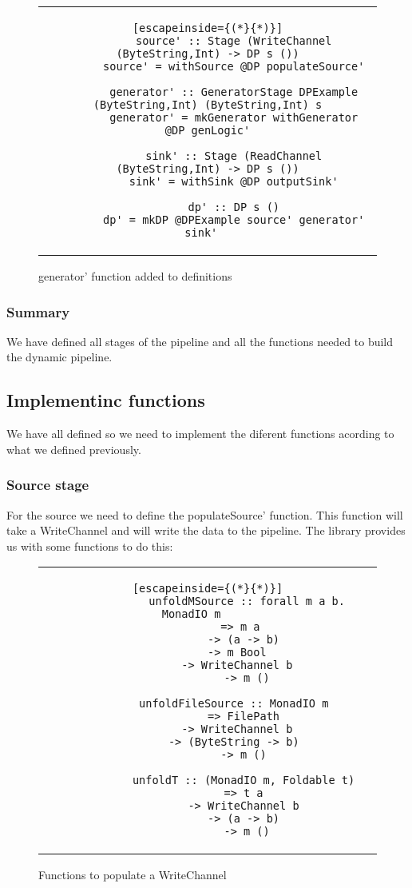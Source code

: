 \begin{figure}[H]
    \centering
    \begin{tabular}{c}
        \begin{lstlisting}[escapeinside={(*}{*)}]
        source' :: Stage (WriteChannel (ByteString,Int) -> DP s ())
        source' = withSource @DP populateSource'

        generator' :: GeneratorStage DPExample (ByteString,Int) (ByteString,Int) s
        generator' = mkGenerator withGenerator @DP genLogic'

        sink' :: Stage (ReadChannel (ByteString,Int) -> DP s ())
        sink' = withSink @DP outputSink'

        dp' :: DP s ()
        dp' = mkDP @DPExample source' generator' sink'  
        \end{lstlisting}
    \end{tabular}
    \caption{generator' function added to definitions}
    \label{fig:DP19}
\end{figure}

\subsubsection{Summary} 
We have defined all stages of the pipeline and all the functions needed to build the dynamic pipeline. 

\subsection{Implementinc functions}
We have all defined so we need to implement the diferent functions acording to what we defined previously. 
\subsubsection{Source stage}
For the source we need to define the populateSource' function. 
This function will take a WriteChannel and will write the data to the pipeline. 
The library provides us with some functions to do this: 

\begin{figure}[H]
    \centering
    \begin{tabular}{c}
        \begin{lstlisting}[escapeinside={(*}{*)}]
            unfoldMSource :: forall m a b. MonadIO m	 
            => m a	
            -> (a -> b)	
            -> m Bool	
            -> WriteChannel b	
            -> m ()

            unfoldFileSource :: MonadIO m	 
            => FilePath	
            -> WriteChannel b	
            -> (ByteString -> b)	
            -> m () 
            
            unfoldT :: (MonadIO m, Foldable t) 
            => t a 
            -> WriteChannel b 
            -> (a -> b) 
            -> m ()
        \end{lstlisting}
    \end{tabular}
    \caption{Functions to populate a WriteChannel}
    \label{fig:DP20}
\end{figure}

